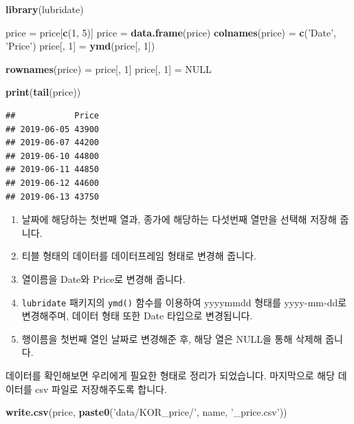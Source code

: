 \documentclass[]{book}
\newenvironment{Shaded}{\begin{snugshade}}{\end{snugshade}}
\newcommand{\DecValTok}[1]{\textcolor[rgb]{0.00,0.00,0.81}{#1}}
\newcommand{\KeywordTok}[1]{\textcolor[rgb]{0.13,0.29,0.53}{\textbf{#1}}}
\newcommand{\NormalTok}[1]{#1}
\newcommand{\OtherTok}[1]{\textcolor[rgb]{0.56,0.35,0.01}{#1}}
\newcommand{\StringTok}[1]{\textcolor[rgb]{0.31,0.60,0.02}{#1}}
\providecommand{\tightlist}{%
  \setlength{\itemsep}{0pt}\setlength{\parskip}{0pt}}
\begin{document}
\begin{Shaded}
\begin{Highlighting}[]
\KeywordTok{library}\NormalTok{(lubridate)}

\NormalTok{price =}\StringTok{ }\NormalTok{price[}\KeywordTok{c}\NormalTok{(}\DecValTok{1}\NormalTok{, }\DecValTok{5}\NormalTok{)] }
\NormalTok{price =}\StringTok{ }\KeywordTok{data.frame}\NormalTok{(price)}
\KeywordTok{colnames}\NormalTok{(price) =}\StringTok{ }\KeywordTok{c}\NormalTok{(}\StringTok{'Date'}\NormalTok{, }\StringTok{'Price'}\NormalTok{)}
\NormalTok{price[, }\DecValTok{1}\NormalTok{] =}\StringTok{ }\KeywordTok{ymd}\NormalTok{(price[, }\DecValTok{1}\NormalTok{])}

\KeywordTok{rownames}\NormalTok{(price) =}\StringTok{ }\NormalTok{price[, }\DecValTok{1}\NormalTok{]}
\NormalTok{price[, }\DecValTok{1}\NormalTok{] =}\StringTok{ }\OtherTok{NULL}

\KeywordTok{print}\NormalTok{(}\KeywordTok{tail}\NormalTok{(price))}
\end{Highlighting}
\end{Shaded}

\begin{verbatim}
##            Price
## 2019-06-05 43900
## 2019-06-07 44200
## 2019-06-10 44800
## 2019-06-11 44850
## 2019-06-12 44600
## 2019-06-13 43750
\end{verbatim}

\begin{enumerate}
\def\labelenumi{\arabic{enumi}.}
\tightlist
\item
  날짜에 해당하는 첫번째 열과, 종가에 해당하는 다섯번째 열만을 선택해 저장해 줍니다.
\item
  티블 형태의 데이터를 데이터프레임 형태로 변경해 줍니다.
\item
  열이름을 Date와 Price로 변경해 줍니다.
\item
  \texttt{lubridate} 패키지의 \texttt{ymd()} 함수를 이용하여 yyyymmdd 형태를 yyyy-mm-dd로 변경해주며, 데이터 형태 또한 Date 타입으로 변경됩니다.
\item
  행이름을 첫번째 열인 날짜로 변경해준 후, 해당 열은 NULL을 통해 삭제해 줍니다.
\end{enumerate}

데이터를 확인해보면 우리에게 필요한 형태로 정리가 되었습니다. 마지막으로 해당 데이터를 csv 파일로 저장해주도록 합니다.

\begin{Shaded}
\begin{Highlighting}[]
\KeywordTok{write.csv}\NormalTok{(price, }\KeywordTok{paste0}\NormalTok{(}\StringTok{'data/KOR_price/'}\NormalTok{, name, }\StringTok{'_price.csv'}\NormalTok{))}
\end{Highlighting}
\end{Shaded}
\end{document}
